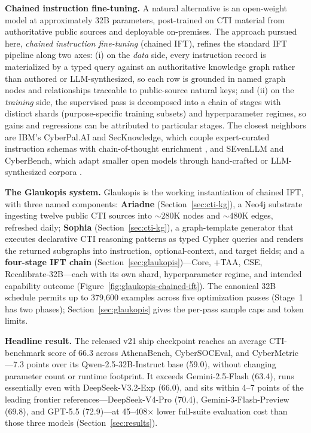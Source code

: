 \documentclass[conference]{IEEEtran}
\begin{document}
\textbf{Chained instruction fine-tuning.} A natural alternative is an open-weight model at approximately 32B parameters, post-trained on CTI material from authoritative public sources and deployable on-premises. The approach pursued here, \textit{chained instruction fine-tuning} (chained IFT), refines the standard IFT pipeline \cite{wei2022flan,ouyang2022instructgpt,chung2022flant5} along two axes: (i) on the \emph{data} side, every instruction record is materialized by a typed query against an authoritative knowledge graph rather than authored or LLM-synthesized, so each row is grounded in named graph nodes and relationships traceable to public-source natural keys; and (ii) on the \emph{training} side, the supervised pass is decomposed into a chain of stages with distinct shards (purpose-specific training subsets) and hyperparameter regimes, so gains and regressions can be attributed to particular stages. The closest neighbors are IBM's CyberPal.AI and SecKnowledge, which couple expert-curated instruction schemas with chain-of-thought enrichment \cite{levi2024cyberpal,levi2025toward}, and SEvenLLM and CyberBench, which adapt smaller open models through hand-crafted or LLM-synthesized corpora \cite{ji2024sevenllm,liu2024cyberbench}.

\textbf{The Glaukopis system.} Glaukopis is the working instantiation of chained IFT, with three named components: \textbf{Ariadne} (Section~\ref{sec:cti-kg}), a Neo4j substrate ingesting twelve public CTI sources into ${\sim}280$K nodes and ${\sim}480$K edges, refreshed daily; \textbf{Sophia} (Section~\ref{sec:cti-kg}), a graph-template generator that executes declarative CTI reasoning patterns as typed Cypher queries and renders the returned subgraphs into instruction, optional-context, and target fields; and a \textbf{four-stage IFT chain} (Section~\ref{sec:glaukopis})---Core, +TAA, CSE, Recalibrate-32B---each with its own shard, hyperparameter regime, and intended capability outcome (Figure~\ref{fig:glaukopis-chained-ift}). The canonical 32B schedule permits up to 379,600 examples across five optimization passes (Stage~1 has two phases); Section~\ref{sec:glaukopis} gives the per-pass sample caps and token limits.

\textbf{Headline result.} The released v21 ship checkpoint \cite{glaukopis2026model} reaches an average CTI-benchmark score of 66.3 across AthenaBench, CyberSOCEval, and CyberMetric---7.3 points over its Qwen-2.5-32B-Instruct base (59.0), without changing parameter count or runtime footprint. It exceeds Gemini-2.5-Flash (63.4), runs essentially even with DeepSeek-V3.2-Exp (66.0), and sits within 4--7 points of the leading frontier references---DeepSeek-V4-Pro (70.4), Gemini-3-Flash-Preview (69.8), and GPT-5.5 (72.9)---at 45--408$\times$ lower full-suite evaluation cost than those three models (Section~\ref{sec:results}).
\end{document}
